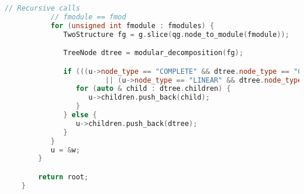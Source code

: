 \begin{lstlisting}[language=C++, style=cpp, caption={Defining the Modular Decomposition}, label={lst:cpp-define-modular-decomposition}, firstnumber=1]
           // Recursive calls
           // fmodule == fmod
           for (unsigned int fmodule : fmodules) {
              TwoStructure fg = g.slice(qg.node_to_module(fmodule));

              TreeNode dtree = modular_decomposition(fg);

              if (((u->node_type == "COMPLETE" && dtree.node_type == "COMPLETE") && (u->node_colors == dtree.node_colors))
                        || (u->node_type == "LINEAR" && dtree.node_type == "LINEAR") && (u->node_colors == dtree.node_colors)) {
                 for (auto & child : dtree.children) {
                    u->children.push_back(child);
                 }
              } else {
                 u->children.push_back(dtree);
              }
           }
           u = &w;
        }

        return root;
    }
\end{lstlisting}


